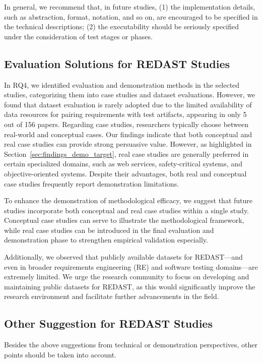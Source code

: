 In general, we recommend that, in future studies, (1) the implementation details, such as abstraction, format, notation, and so on, are encouraged to be specified in the technical descriptions; (2) the executability should be seriously specified under the consideration of test stages or phases.

\subsection{Evaluation Solutions for REDAST Studies}
In RQ4, we identified evaluation and demonstration methods in the selected studies, categorizing them into case studies and dataset evaluations. However, we found that dataset evaluation is rarely adopted due to the limited availability of data resources for pairing requirements with test artifacts, appearing in only 5 out of 156 papers. Regarding case studies, researchers typically choose between real-world and conceptual cases. Our findings indicate that both conceptual and real case studies can provide strong persuasive value. However, as highlighted in Section~\ref{sec:findings_demo_target}, real case studies are generally preferred in certain specialized domains, such as web services, safety-critical systems, and objective-oriented systems. Despite their advantages, both real and conceptual case studies frequently report demonstration limitations.

To enhance the demonstration of methodological efficacy, we suggest that future studies incorporate both conceptual and real case studies within a single study. Conceptual case studies can serve to illustrate the methodological framework, while real case studies can be introduced in the final evaluation and demonstration phase to strengthen empirical validation especially.

Additionally, we observed that publicly available datasets for REDAST—and even in broader requirements engineering (RE) and software testing domains—are extremely limited. We urge the research community to focus on developing and maintaining public datasets for REDAST, as this would significantly improve the research environment and facilitate further advancements in the field.

\subsection{Other Suggestion for REDAST Studies}
Besides the above suggestions from technical or demonstration perspectives, other points should be taken into account.

